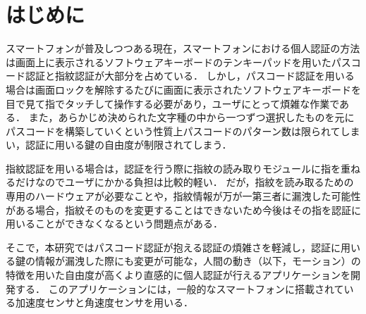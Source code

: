 \section{はじめに}
スマートフォンが普及しつつある現在，スマートフォンにおける個人認証の方法は画面上に表示されるソフトウェアキーボードのテンキーパッドを用いたパスコード認証と指紋認証が大部分を占めている．
しかし，パスコード認証を用いる場合は画面ロックを解除するたびに画面に表示されたソフトウェアキーボードを目で見て指でタッチして操作する必要があり，ユーザにとって煩雑な作業である．
また，あらかじめ決められた文字種の中から一つずつ選択したものを元にパスコードを構築していくという性質上パスコードのパターン数は限られてしまい，認証に用いる鍵の自由度が制限されてしまう．

指紋認証を用いる場合は，認証を行う際に指紋の読み取りモジュールに指を重ねるだけなのでユーザにかかる負担は比較的軽い．
だが，指紋を読み取るための専用のハードウェアが必要なことや，指紋情報が万が一第三者に漏洩した可能性がある場合，指紋そのものを変更することはできないため今後はその指を認証に用いることができなくなるという問題点がある．

そこで，本研究ではパスコード認証が抱える認証の煩雑さを軽減し，認証に用いる鍵の情報が漏洩した際にも変更が可能な，人間の動き（以下，モーション）の特徴を用いた自由度が高くより直感的に個人認証が行えるアプリケーションを開発する．
このアプリケーションには，一般的なスマートフォンに搭載されている加速度センサと角速度センサを用いる．

